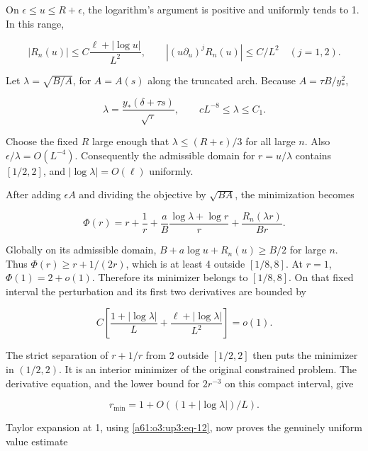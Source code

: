 \documentclass[11pt,letterpaper]{article}
\numberwithin{equation}{section}
\theoremstyle{remark}\newtheorem{remark}[theorem]{Remark}
\begin{document}
On \(\epsilon\le u\le R+\epsilon\), the logarithm's argument is positive
and uniformly tends to 1. In this range,

\begin{equation}
|R_n(u)|\le C\frac{\ell+|\log u|}{L^2},\qquad
|(u\partial_u)^jR_n(u)|\le C/L^2\quad (j=1,2).
\label{a61:o3:up3:eq-12}
\end{equation}

Let \(\lambda=\sqrt{B/A}\), for \(A=A(s)\) along the truncated arch.
Because \(A=\tau B/y_*^2\),

\begin{equation}
\lambda=\frac{y_*(\delta+\tau s)}{\sqrt\tau},\qquad
cL^{-8}\le\lambda\le C_1.
\label{a61:o3:up3:eq-13}
\end{equation}

Choose the fixed \(R\) large enough that \(\lambda\le(R+\epsilon)/3\)
for all large \(n\). Also \(\epsilon/\lambda=O(L^{-4})\). Consequently
the admissible domain for \(r=u/\lambda\) contains \([1/2,2]\), and
\(|\log\lambda|=O(\ell)\) uniformly.

After adding \(\epsilon A\) and dividing the objective by \(\sqrt{BA}\),
the minimization becomes

\begin{equation}
\Phi(r)=r+\frac1r+
 \frac{a}{B}\frac{\log\lambda+\log r}{r}
 +\frac{R_n(\lambda r)}{Br}.
\label{a61:o3:up3:eq-14}
\end{equation}

Globally on its admissible domain, \(B+a\log u+R_n(u)\ge B/2\) for large
\(n\). Thus \(\Phi(r)\ge r+1/(2r)\), which is at least 4 outside
\([1/8,8]\). At \(r=1\), \(\Phi(1)=2+o(1)\). Therefore its minimizer
belongs to \([1/8,8]\). On that fixed interval the perturbation and its
first two derivatives are bounded by

\[
C\left[\frac{1+|\log\lambda|}{L}
       +\frac{\ell+|\log\lambda|}{L^2}\right]=o(1).
\]

The strict separation of \(r+1/r\) from 2 outside \([1/2,2]\) then puts
the minimizer in \((1/2,2)\). It is an interior minimizer of the
original constrained problem. The derivative equation, and the lower
bound for \(2r^{-3}\) on this compact interval, give

\begin{equation}
r_{\min}=1+O((1+|\log\lambda|)/L).
\label{a61:o3:up3:eq-15}
\end{equation}

Taylor expansion at 1, using \eqref{a61:o3:up3:eq-12}, now proves the genuinely
uniform value estimate
\end{document}
